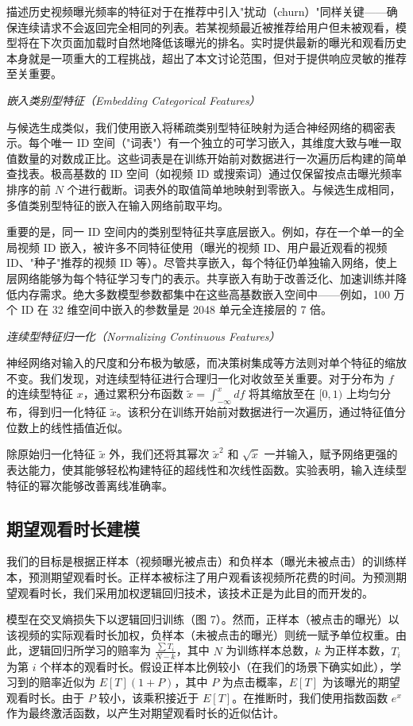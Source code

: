 描述历史视频曝光频率的特征对于在推荐中引入"扰动（churn）"同样关键——确保连续请求不会返回完全相同的列表。若某视频最近被推荐给用户但未被观看，模型将在下次页面加载时自然地降低该曝光的排名。实时提供最新的曝光和观看历史本身就是一项重大的工程挑战，超出了本文讨论范围，但对于提供响应灵敏的推荐至关重要。

\textit{嵌入类别型特征（Embedding Categorical Features）}

与候选生成类似，我们使用嵌入将稀疏类别型特征映射为适合神经网络的稠密表示。每个唯一 ID 空间（"词表"）有一个独立的可学习嵌入，其维度大致与唯一取值数量的对数成正比。这些词表是在训练开始前对数据进行一次遍历后构建的简单查找表。极高基数的 ID 空间（如视频 ID 或搜索词）通过仅保留按点击曝光频率排序的前 $N$ 个进行截断。词表外的取值简单地映射到零嵌入。与候选生成相同，多值类别型特征的嵌入在输入网络前取平均。

重要的是，同一 ID 空间内的类别型特征共享底层嵌入。例如，存在一个单一的全局视频 ID 嵌入，被许多不同特征使用（曝光的视频 ID、用户最近观看的视频 ID、"种子"推荐的视频 ID 等）。尽管共享嵌入，每个特征仍单独输入网络，使上层网络能够为每个特征学习专门的表示。共享嵌入有助于改善泛化、加速训练并降低内存需求。绝大多数模型参数都集中在这些高基数嵌入空间中——例如，100 万个 ID 在 32 维空间中嵌入的参数量是 2048 单元全连接层的 7 倍。

\textit{连续型特征归一化（Normalizing Continuous Features）}

神经网络对输入的尺度和分布极为敏感，而决策树集成等方法则对单个特征的缩放不变。我们发现，对连续型特征进行合理归一化对收敛至关重要。对于分布为 $f$ 的连续型特征 $x$，通过累积分布函数 $\tilde{x} = \int_{-\infty}^{x} df$ 将其缩放至在 $[0, 1)$ 上均匀分布，得到归一化特征 $\tilde{x}$。该积分在训练开始前对数据进行一次遍历，通过特征值分位数上的线性插值近似。

除原始归一化特征 $\tilde{x}$ 外，我们还将其幂次 $\tilde{x}^2$ 和 $\sqrt{\tilde{x}}$ 一并输入，赋予网络更强的表达能力，使其能够轻松构建特征的超线性和次线性函数。实验表明，输入连续型特征的幂次能够改善离线准确率。

\subsection{期望观看时长建模}

我们的目标是根据正样本（视频曝光被点击）和负样本（曝光未被点击）的训练样本，预测期望观看时长。正样本被标注了用户观看该视频所花费的时间。为预测期望观看时长，我们采用加权逻辑回归技术，该技术正是为此目的而开发的。

模型在交叉熵损失下以逻辑回归训练（图 7）。然而，正样本（被点击的曝光）以该视频的实际观看时长加权，负样本（未被点击的曝光）则统一赋予单位权重。由此，逻辑回归所学习的赔率为 $\frac{\sum T_i}{N - k}$，其中 $N$ 为训练样本总数，$k$ 为正样本数，$T_i$ 为第 $i$ 个样本的观看时长。假设正样本比例较小（在我们的场景下确实如此），学习到的赔率近似为 $E[T](1 + P)$，其中 $P$ 为点击概率，$E[T]$ 为该曝光的期望观看时长。由于 $P$ 较小，该乘积接近于 $E[T]$。在推断时，我们使用指数函数 $e^x$ 作为最终激活函数，以产生对期望观看时长的近似估计。

